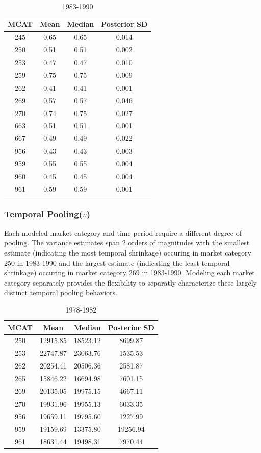 \documentclass[12pt]{article}
\begin{document}
%
\begin{table}[h!]
\centering
\begin{tabular}{|c|c|c|c|}
\hline
MCAT & Mean & Median & Posterior SD     \\ \hline
245 & 0.65 & 0.65 & 0.014       \\
250 & 0.51 & 0.51 & 0.002       \\
253 & 0.47 & 0.47 & 0.010       \\
259 & 0.75 & 0.75 & 0.009       \\
262 & 0.41 & 0.41 & 0.001       \\
269 & 0.57 & 0.57 & 0.046       \\
270 & 0.74 & 0.75 & 0.027       \\
663 & 0.51 & 0.51 & 0.001       \\
667 & 0.49 & 0.49 & 0.022       \\
956 & 0.43 & 0.43 & 0.003       \\
959 & 0.55 & 0.55 & 0.004       \\
960 & 0.45 & 0.45 & 0.004       \\
961 & 0.59 & 0.59 & 0.001       \\
\hline
\end{tabular}
\caption{1983-1990}
\label{rho83}
\end{table}

\subsubsection{Temporal Pooling(\(v\))}\label{temporal-pooling-v}

Each modeled market category and time period require a different degree
of pooling. The variance estimates span 2 orders of magnitudes with the
smallest estimate (indicating the most temporal shrinkage) occuring in
market category 250 in 1983-1990 and the largest estimate (indicating
the least temporal shrinkage) occuring in market category 269 in
1983-1990. Modeling each market category separately provides the
flexibility to separatly characterize these largely distinct temporal
pooling behaviors.

%
\begin{table}[h!]
\centering
\begin{tabular}{|c|c|c|c|}
\hline
MCAT & Mean & Median & Posterior SD     \\ \hline
250 & 12915.85 & 18523.12 & 8699.87     \\
253 & 22747.87 & 23063.76 & 1535.53     \\
262 & 20254.41 & 20506.36 & 2581.87     \\
265 & 15846.22 & 16694.98 & 7601.15     \\
269 & 20135.05 & 19975.15 & 4667.11     \\
270 & 19931.96 & 19955.13 & 6033.35     \\
956 & 19659.11 & 19795.60 & 1227.99     \\
959 & 19159.69 & 13375.80 & 19256.94    \\
961 & 18631.44 & 19498.31 & 7970.44     \\
\hline
\end{tabular}
\caption{1978-1982}
\label{v78}
\end{table}
\end{document}
